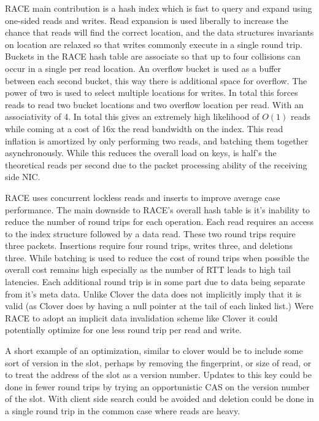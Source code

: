 RACE main contribution is a hash index which is fast to query and expand using
one-sided reads and writes. Read expansion is used liberally to increase the
chance that reads will find the correct location, and the data structures
invariants on location are relaxed so that writes commonly execute in a single
round trip.  Buckets in the RACE hash table are associate so that up to four
collisions can occur in a single per read location. An overflow bucket is used
as a buffer between each second bucket, this way there is additional space for
overflow. The power of two is used to select multiple locations for writes. In
total this forces reads to read two bucket locations and two overflow location
per read.  With an associativity of 4. In total this gives an extremely high
likelihood of $O(1)$ reads while coming at a cost of 16x the read bandwidth on
the index.  This read inflation is amortized by only performing two reads, and
batching them together asynchronously. While this reduces the overall load on
keys, is half's the theoretical reads per second due to the packet processing
ability of the receiving side NIC. 

RACE uses concurrent lockless reads and inserts to improve average case
performance. The main downside to RACE's overall hash table is it's inability to
reduce the number of round trips for each operation. Each read requires an
access to the index structure followed by a data read. These two round trips
require three packets.  Insertions require four round trips, writes three, and
deletions three. While batching is used to reduce the cost of round trips when
possible the overall cost remains high especially as the number of RTT leads to
high tail latencies. Each additional round trip is in some part due to data
being separate from it's meta data. Unlike Clover the data does not implicitly
imply that it is valid (as Clover does by having a null pointer at the tail of
each linked list.) Were RACE to adopt an implicit data invalidation scheme like
Clover it could potentially optimize for one less round trip per read and write.

A short example of an optimization, similar to clover would be to include some
sort of version in the slot, perhaps by removing the fingerprint, or size of
read, or to treat the address of the slot as a version number. Updates to this
key could be done in fewer round trips by trying an opportunistic CAS on the
version number of the slot. With client side search could be avoided and
deletion could be done in a single round trip in the common case where reads are
heavy.

